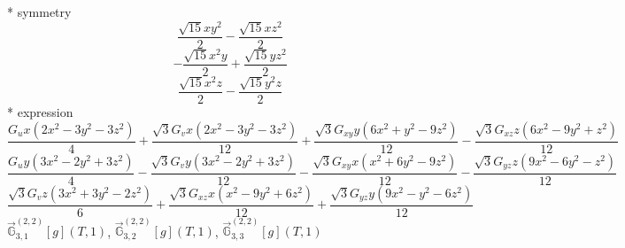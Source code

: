 \documentclass[fleqn,8pt]{jsarticle}
\begin{document}
\noindent\quad ** symmetry
\begin{dmath*}
\frac{\sqrt{15} x y^{2}}{2} - \frac{\sqrt{15} x z^{2}}{2}
\end{dmath*}
\begin{dmath*}
- \frac{\sqrt{15} x^{2} y}{2} + \frac{\sqrt{15} y z^{2}}{2}
\end{dmath*}
\begin{dmath*}
\frac{\sqrt{15} x^{2} z}{2} - \frac{\sqrt{15} y^{2} z}{2}
\end{dmath*}
\noindent\quad ** expression
\begin{dmath*}
\frac{G_{u} x \left(2 x^{2} - 3 y^{2} - 3 z^{2}\right)}{4} + \frac{\sqrt{3} G_{v} x \left(2 x^{2} - 3 y^{2} - 3 z^{2}\right)}{12} + \frac{\sqrt{3} G_{xy} y \left(6 x^{2} + y^{2} - 9 z^{2}\right)}{12} - \frac{\sqrt{3} G_{xz} z \left(6 x^{2} - 9 y^{2} + z^{2}\right)}{12}
\end{dmath*}
\begin{dmath*}
\frac{G_{u} y \left(3 x^{2} - 2 y^{2} + 3 z^{2}\right)}{4} - \frac{\sqrt{3} G_{v} y \left(3 x^{2} - 2 y^{2} + 3 z^{2}\right)}{12} - \frac{\sqrt{3} G_{xy} x \left(x^{2} + 6 y^{2} - 9 z^{2}\right)}{12} - \frac{\sqrt{3} G_{yz} z \left(9 x^{2} - 6 y^{2} - z^{2}\right)}{12}
\end{dmath*}
\begin{dmath*}
\frac{\sqrt{3} G_{v} z \left(3 x^{2} + 3 y^{2} - 2 z^{2}\right)}{6} + \frac{\sqrt{3} G_{xz} x \left(x^{2} - 9 y^{2} + 6 z^{2}\right)}{12} + \frac{\sqrt{3} G_{yz} y \left(9 x^{2} - y^{2} - 6 z^{2}\right)}{12}
\end{dmath*}
\noindent\quad $\vec{\mathbb{G}}_{3,1}^{(2,2)}[g](T,1)$, $\vec{\mathbb{G}}_{3,2}^{(2,2)}[g](T,1)$, $\vec{\mathbb{G}}_{3,3}^{(2,2)}[g](T,1)$
\end{document}
